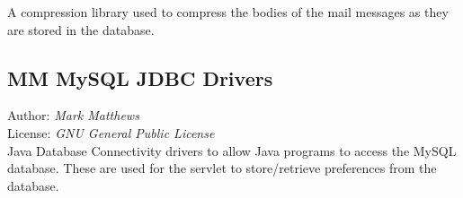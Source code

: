 A compression library used to compress the bodies of the mail messages as they are stored in the database.

\subsection{MM MySQL JDBC Drivers}
Author: \emph{Mark Matthews} \\
License: \emph{GNU General Public License} \\

Java Database Connectivity drivers to allow Java programs to access the MySQL database.  These are used for the servlet to store/retrieve preferences from the database.


